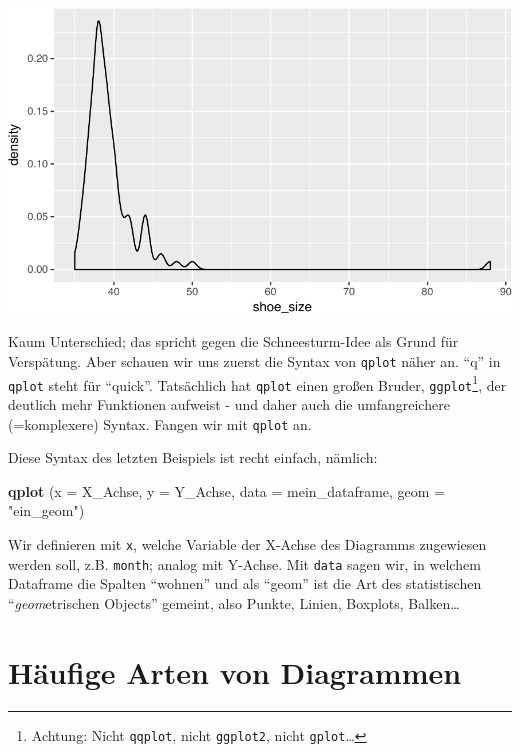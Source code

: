 \documentclass[12pt,]{book}
\newenvironment{Shaded}{\begin{snugshade}}{\end{snugshade}}
\newcommand{\KeywordTok}[1]{\textcolor[rgb]{0.13,0.29,0.53}{\textbf{{#1}}}}
\newcommand{\DataTypeTok}[1]{\textcolor[rgb]{0.13,0.29,0.53}{{#1}}}
\newcommand{\StringTok}[1]{\textcolor[rgb]{0.31,0.60,0.02}{{#1}}}
\newcommand{\NormalTok}[1]{{#1}}
\let\rmarkdownfootnote\footnote%
\def\footnote{\protect\rmarkdownfootnote}
\begin{document}
\begin{center}\includegraphics[width=0.7\linewidth]{050_Daten_visualisieren_files/figure-latex/unnamed-chunk-7-1} \end{center}

Kaum Unterschied; das spricht gegen die Schneesturm-Idee als Grund für
Verspätung. Aber schauen wir uns zuerst die Syntax von \texttt{qplot}
näher an. ``q'' in \texttt{qplot} steht für ``quick''. Tatsächlich hat
\texttt{qplot} einen großen Bruder, \texttt{ggplot}\footnote{Achtung:
  Nicht \texttt{qqplot}, nicht \texttt{ggplot2}, nicht
  \texttt{gplot}\ldots{}}, der deutlich mehr Funktionen aufweist - und
daher auch die umfangreichere (=komplexere) Syntax. Fangen wir mit
\texttt{qplot} an.

Diese Syntax des letzten Beispiels ist recht einfach, nämlich:

\begin{Shaded}
\begin{Highlighting}[]
\KeywordTok{qplot} \NormalTok{(}\DataTypeTok{x =} \NormalTok{X_Achse, }\DataTypeTok{y =} \NormalTok{Y_Achse, }\DataTypeTok{data =} \NormalTok{mein_dataframe, }\DataTypeTok{geom =} \StringTok{"ein_geom"}\NormalTok{)}
\end{Highlighting}
\end{Shaded}

Wir definieren mit \texttt{x}, welche Variable der X-Achse des Diagramms
zugewiesen werden soll, z.B. \texttt{month}; analog mit Y-Achse. Mit
\texttt{data} sagen wir, in welchem Dataframe die Spalten ``wohnen'' und
als ``geom'' ist die Art des statistischen ``\emph{geom}etrischen
Objects'' gemeint, also Punkte, Linien, Boxplots, Balken\ldots{}

\section{Häufige Arten von
Diagrammen}\label{haufige-arten-von-diagrammen}
\end{document}
